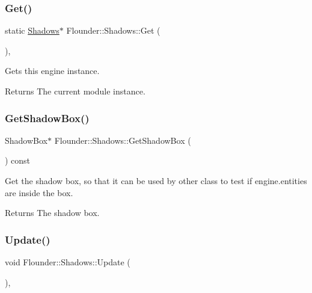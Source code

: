 \subsubsection{\texorpdfstring{Get()}{Get()}}
{\footnotesize\ttfamily static \hyperlink{class_flounder_1_1_shadows}{Shadows}$\ast$ Flounder\+::\+Shadows\+::\+Get (\begin{DoxyParamCaption}{ }\end{DoxyParamCaption})\hspace{0.3cm}{\ttfamily [inline]}, {\ttfamily [static]}}



Gets this engine instance. 

\begin{DoxyReturn}{Returns}
The current module instance. 
\end{DoxyReturn}
\mbox{\label{class_flounder_1_1_shadows_a358a70d59e5a742b63e3b4acd9a23910}} 
\subsubsection{\texorpdfstring{Get\+Shadow\+Box()}{GetShadowBox()}}
{\footnotesize\ttfamily Shadow\+Box$\ast$ Flounder\+::\+Shadows\+::\+Get\+Shadow\+Box (\begin{DoxyParamCaption}{ }\end{DoxyParamCaption}) const\hspace{0.3cm}{\ttfamily [inline]}}



Get the shadow box, so that it can be used by other class to test if engine.\+entities are inside the box. 

\begin{DoxyReturn}{Returns}
The shadow box. 
\end{DoxyReturn}
\mbox{\label{class_flounder_1_1_shadows_a14478c216ad1927bb734d5883dc283de}} 
\subsubsection{\texorpdfstring{Update()}{Update()}}
{\footnotesize\ttfamily void Flounder\+::\+Shadows\+::\+Update (\begin{DoxyParamCaption}{ }\end{DoxyParamCaption})\hspace{0.3cm}{\ttfamily [override]}, {\ttfamily [virtual]}}



